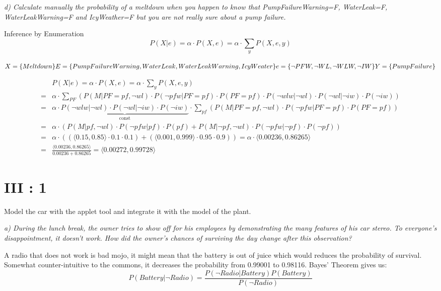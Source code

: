 \em d) Calculate manually the probability of a meltdown when you happen to know that PumpFailureWarning=F, WaterLeak=F, WaterLeakWarning=F and IcyWeather=F but you are not really sure about a pump failure. \em
\newpage

Inference by Enumeration
$$P(X|e) = \alpha\cdot P(X,e) = \alpha\cdot\sum_{y}P(X,e,y)$$

$X = \{Meltdown\}\\E=\{PumpFailureWarning, WaterLeak, WaterLeakWarning, IcyWeater\}\\e=\{\neg PFW, \neg WL, \neg WLW,\neg IW\}\\Y=\{PumpFailure\}$

\begin{align*}
  & P(X|e) = \alpha\cdot P(X,e) = \alpha\cdot\sum_{y}P(X,e,y)\\
  = & \alpha\cdot\sum_{PF}(P(M|PF=pf,\neg wl)\cdot
  P(\neg pfw | PF = pf)\cdot
  P(PF=pf)\cdot
  P(\neg wlw | \neg wl)\cdot
  P(\neg wl | \neg iw)\cdot
  P(\neg iw))\\
  = & \alpha\cdot \underbrace{P(\neg wlw | \neg wl)\cdot P(\neg wl | \neg iw)\cdot P(\neg iw)}_{\mathrm{const}}\cdot
  \sum_{pf}(P(M|PF = pf,\neg wl)\cdot
  P(\neg pfw|PF=pf)\cdot P(PF=pf))\\
  = & \alpha\cdot(P(M|pf,\neg wl)\cdot P(\neg pfw|pf)\cdot P(pf)
  + P(M|\neg pf, \neg wl)\cdot P(\neg pfw| \neg pf)\cdot P(\neg pf))\\
  = & \alpha\cdot((\langle 0.15,0.85\rangle \cdot 0.1\cdot 0.1)+(\langle 0.001, 0.999\rangle \cdot 0.95 \cdot 0.9))
  = \alpha\cdot\langle 0.00236,0.86265 \rangle\\
  = & \frac{\langle 0.00236,0.86265 \rangle}{0.00236+0.86265} = \langle 0.00272,0.99728  \rangle
\end{align*}

\section{III : 1}
Model the car with the applet tool and integrate it with the model of the plant.



\em a) During the lunch break, the owner tries to show off for his employees by demonstrating the many features of his car stereo. To everyone's disappointment, it doesn't work. How did the owner's chances of surviving the day change after this observation?\em

A radio that does not work is bad mojo, it might mean that the battery is out of juice which would reduces the probability of survival. Somewhat counter-intuitive to the commons, it decreases the probability from 0.99001 to 0.98116. Bayes' Theorem gives us: $$P(Battery|\neg Radio) = \frac{P(\neg Radio|Battery)P(Battery)}{P(\neg Radio)}$$

